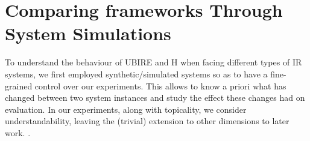 
\section{Comparing frameworks Through System Simulations}
\label{sec:simulations}


To understand the behaviour of UBIRE and H when facing different types of IR systems, we first employed synthetic/simulated systems so as to have a fine-grained control over our experiments. This allows to know a priori what has changed between two system instances and study the effect these changes had on evaluation. In our experiments, along with topicality, we consider understandability, leaving the (trivial) extension to other dimensions to later work. .




%



